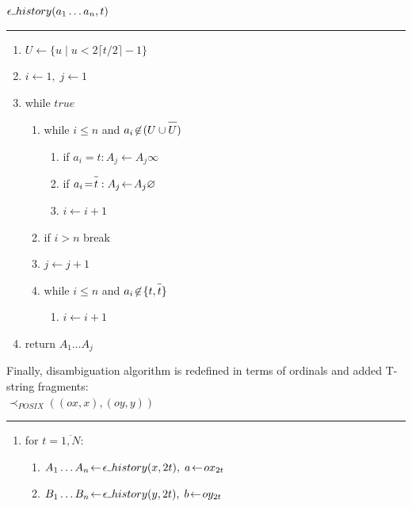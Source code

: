 \documentclass{article}
\newcommand{\Xset}{\!\leftarrow\!}
\newcommand{\Xund}{\rule{.4em}{.4pt}} %
\newcommand{\Xeq}{\!=\!}
\newcommand*{\Xbar}[1]{\overline{#1\vphantom{\bar{#1}}}}
\theoremstyle{definition}
\begin{document}
\begin{multicols}{2}
    $\epsilon \Xund history (a_1 \dots a_n, t)$
    \hrule
    \begin{enumerate}[leftmargin=0in]
        \smallskip
        \item[] $U \Xset \{ u \mid u < 2 \lceil t / 2 \rceil \!-\! 1 \}$
        \item[] $i \Xset 1, \; j \Xset 1$

        \item[] while $true$
        \begin{enumerate}
            \item[] while $i \leq n$ and $a_i \!\not\in\! (U \cup \Xbar{U})$
            \begin{enumerate}
                \item[] if $a_i \Xeq t: A_j \Xset A_j \infty$
                \item[] if $a_i \Xeq \Xbar{t}: A_j \Xset A_j \varnothing$
                \item[] $i \Xset i \!+\! 1$
            \end{enumerate}

            \item[] if $i \!>\! n$ break
            \item[] $j \Xset j \!+\! 1$

            \item[] while $i \leq n$ and $a_i \!\not\in\! \{t, \Xbar{t}\}$
            \begin{enumerate}
                \item[] $i \Xset i \!+\! 1$
            \end{enumerate}

        \end{enumerate}
        \item[] return $A_1 \dots A_j$
    \end{enumerate}

    \bigskip

Finally, disambiguation algorithm is redefined in terms of ordinals and added T-string fragments:
\\

    $\prec_{POSIX}((ox, x), (oy, y))$
    \hrule
    \begin{enumerate}[leftmargin=0in]
        \smallskip
        \item[] for $t \Xeq \overline{1, N}$:
        \begin{enumerate}
            \item[] $A_1 \dots A_n \Xset \epsilon \Xund history(x, 2t), \; a \Xset ox_{2t}$
            \item[] $B_1 \dots B_n \Xset \epsilon \Xund history(y, 2t), \; b \Xset oy_{2t}$


\end{enumerate}
\end{enumerate}
\end{multicols}
\end{document}
